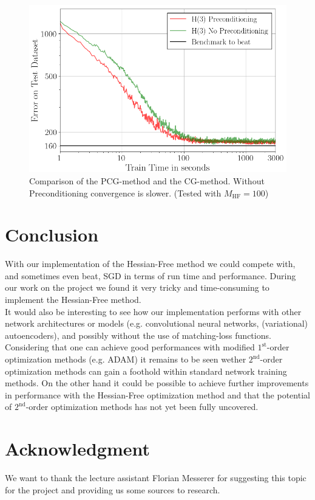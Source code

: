 \documentclass[conference]{IEEEtran}
\begin{document}
	\begin{figure}[htbp]
		\centerline{\includegraphics[scale=0.53]{Precond.png}}
		\caption{Comparison of the PCG-method and the CG-method. Without Preconditioning convergence is slower. (Tested with $M_{\mathrm{HF}}=100$)}
		\label{fig4}
	\end{figure}



	\section{Conclusion}
	\noindent
	With our implementation of the Hessian-Free method we could compete with, and sometimes even beat, SGD in terms of run time and performance.
	During our work on the project we found it very tricky and time-consuming to implement the Hessian-Free method.\\
	It would also be interesting to see how our implementation performs with other network architectures or models (e.g. convolutional neural networks, (variational) autoencoders), and possibly without the use of matching-loss functions.\\
	Considering that one can achieve good performances with modified $1^{\text{st}}$-order optimization methods (e.g. ADAM) it remains to be seen wether $2^{\text{nd}}$-order optimization methods can gain a foothold within standard network training methods. On the other hand it could be possible to achieve further improvements in performance with the Hessian-Free optimization method and that the potential of $2^{\text{nd}}$-order optimization methods has not yet been fully uncovered.

	\section*{Acknowledgment}
	\noindent
	We want to thank the lecture assistant Florian Messerer for suggesting this topic for the project and providing us some sources to research.
\end{document}

